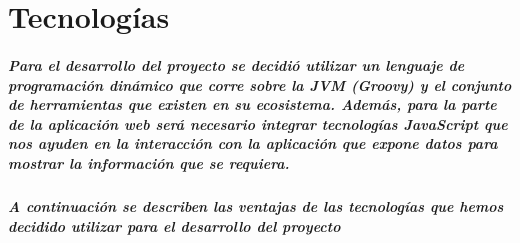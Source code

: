 \chapter{Tecnologías}
\paragraph{Para el desarrollo del proyecto se decidió utilizar un lenguaje de programación dinámico que corre sobre la JVM (Groovy) y el conjunto de herramientas que existen en su ecosistema. Además, para la parte de la aplicación web será necesario integrar tecnologías JavaScript que nos ayuden en la interacción con la aplicación que expone datos para mostrar la información que se requiera.}

\paragraph{A continuación se describen las ventajas de las tecnologías que hemos decidido utilizar para el desarrollo del proyecto}

